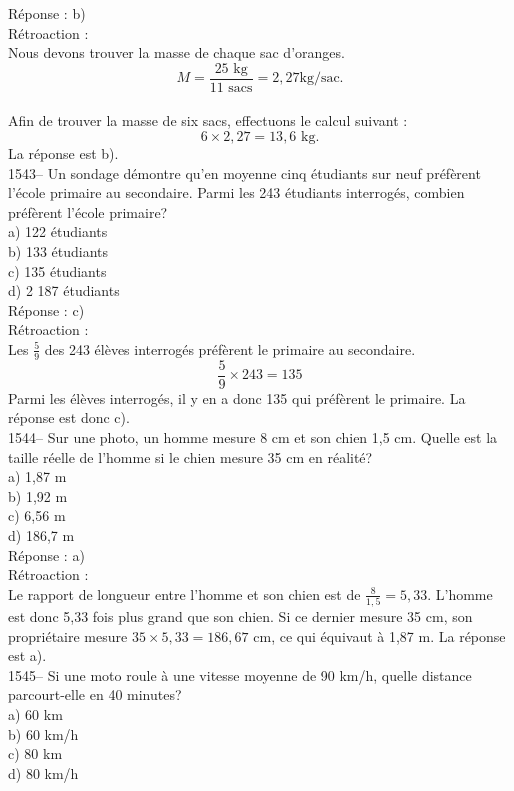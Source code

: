 R\'eponse : b)\\

R\'etroaction :\\
Nous devons trouver la masse de chaque sac d'oranges. $$M =
\frac{\textrm{25 kg}}{\textrm{11  sacs}}=2,27 {\textrm{
kg/sac.}}$$\\
Afin de trouver la masse de six sacs, effectuons le
calcul suivant : $$6\times 2,27 = 13,6{\textrm{ kg}}.$$ La r\'eponse est
b).\\

1543-- Un sondage d\'emontre qu'en moyenne cinq \'etudiants sur neuf
pr\'ef\`erent l'\'ecole primaire au secondaire. Parmi les 243
\'etudiants interrog\'es, combien pr\'ef\`erent l'\'ecole primaire?\\
a) 122 \'etudiants\\
b) 133 \'etudiants\\
c) 135 \'etudiants\\
d) 2 187 \'etudiants\\

R\'eponse : c)\\

R\'etroaction :\\
Les $\frac{5}{9}$ des 243 \'el\`eves interrog\'es pr\'ef\`erent le
primaire au secondaire. $$\frac{5}{9}\times 243 = 135$$ Parmi les
\'el\`eves interrog\'es, il y en a donc 135 qui pr\'ef\`erent le
primaire. La r\'eponse est donc c).\\

1544-- Sur une photo, un homme mesure 8 cm et son chien 1,5 cm.
Quelle est la taille r\'eelle de l'homme si le chien mesure
35 cm en r\'ealit\'e?\\
a) 1,87 m\\
b) 1,92 m\\
c) 6,56 m\\
d) 186,7 m\\

R\'eponse : a)\\

R\'etroaction :\\
Le rapport de longueur entre l'homme et son chien est de
$\frac{8}{1,5}=5,33$. L'homme est donc 5,33 fois plus grand que son
chien. Si ce dernier mesure 35 cm, son propri\'etaire mesure
$35\times5,33=186,67$
cm, ce qui \'equivaut \`a 1,87 m. La r\'eponse est a).\\

1545-- Si une moto roule \`a une vitesse moyenne de 90 km/h, quelle
distance
parcourt-elle en 40 minutes?\\
a) 60 km\\
b) 60 km/h\\
c) 80 km\\
d) 80 km/h\\

